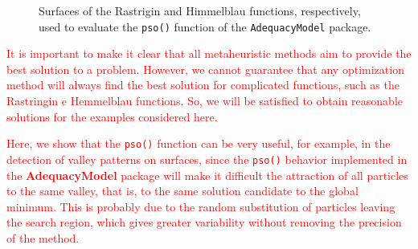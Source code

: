 \documentclass[10pt,letterpaper]{article}
\begin{document}
\begin{figure}[H]
	\centering
	
	\caption{Surfaces of the Rastrigin and Himmelblau functions, respectively, used to evaluate the \texttt{pso()} function of the \texttt{AdequacyModel} package.}
\end{figure}


\textcolor{red}{It is important to make it clear that all metaheuristic methods aim to provide the best solution to a problem. However, we cannot guarantee that any optimization method will always find the best solution for complicated functions, such as the  Rastringin e Hemmelblau functions. So, we will be satisfied to obtain reasonable solutions for the examples considered here.}

\textcolor{red}{Here, we show that the \texttt{pso()} function can be very useful, for example, in the detection of valley patterns on surfaces, since the \texttt{pso()} behavior implemented in the \textbf{AdequacyModel} package will make it difficult the attraction of all particles to the same valley, that is, to the same solution candidate to the global minimum. This is probably due to the random substitution of particles leaving the search region, which gives greater variability without removing the precision of the method.}
 
\end{document}
